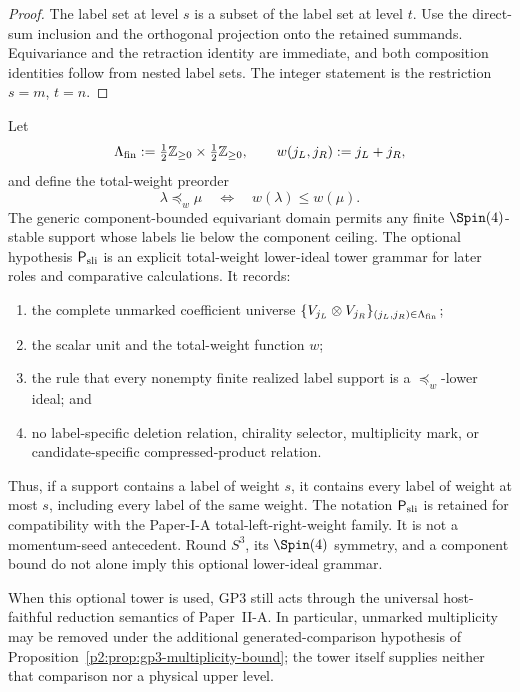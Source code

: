 \documentclass[11pt,a4paper]{article}
\begin{document}
\begin{proof}
The label set at level \(s\) is a subset of the label set at level \(t\).
Use the direct-sum inclusion and the orthogonal projection onto the retained
summands.  Equivariance and the retraction identity are immediate, and both
composition identities follow from nested label sets.  The integer statement
is the restriction \(s=m\), \(t=n\).
\end{proof}

\begin{definition}
\label{p2:def:spectral-lower-ideal-finite-role-package}
Let
\[
 \Lambda_{\rm fin}
 :=
 \tfrac12\mathbb Z_{\ge0}\times\tfrac12\mathbb Z_{\ge0},
 \qquad
 w(j_L,j_R):=j_L+j_R,
\]
and define the total-weight preorder
\[
 \lambda\preceq_w\mu
 \quad\Longleftrightarrow\quad
 w(\lambda)\le w(\mu).
\]
The generic component-bounded equivariant domain permits any finite
\(\Spin(4)\)-stable support whose labels lie below the component ceiling.
The optional hypothesis \(\mathsf P_{\rm sli}\) is an explicit total-weight
lower-ideal tower grammar for later roles and comparative calculations.  It
records:
\begin{enumerate}[label=(\roman*),leftmargin=2em]
\item the complete unmarked coefficient universe
\(\{V_{j_L}\otimes V_{j_R}\}_{(j_L,j_R)\in\Lambda_{\rm fin}}\);
\item the scalar unit and the total-weight function \(w\);
\item the rule that every nonempty finite realized label support is a
\(\preceq_w\)-lower ideal; and
\item no label-specific deletion relation, chirality selector, multiplicity
mark, or candidate-specific compressed-product relation.
\end{enumerate}
Thus, if a support contains a label of weight \(s\), it contains every label
of weight at most \(s\), including every label of the same weight.  The
notation \(\mathsf P_{\rm sli}\) is retained for compatibility with the
Paper-I-A total-left-right-weight family.  It is not a momentum-seed antecedent.  Round \(S^3\), its \(\Spin(4)\) symmetry,
and a component bound do not alone imply this optional lower-ideal grammar.



When this optional tower is used, GP3 still acts through the universal
host-faithful reduction semantics of Paper~II-A.  In particular, unmarked multiplicity may be removed under the additional
generated-comparison hypothesis of
Proposition~\ref{p2:prop:gp3-multiplicity-bound}; the tower itself
supplies neither that comparison nor a physical upper level.
\end{definition}
\end{document}
